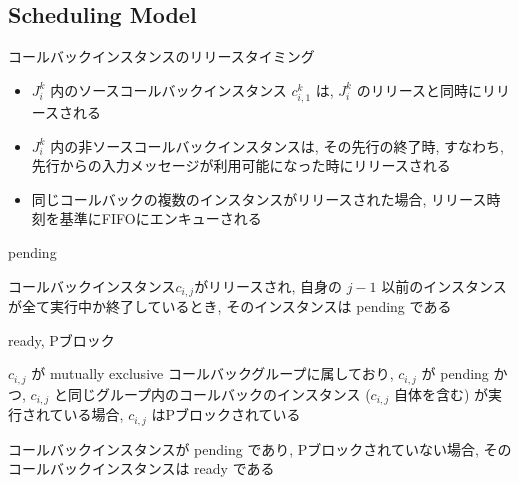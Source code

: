 \subsection{Scheduling Model}
\label{ssec: scheduling_model}


\begin{frame}{コールバックインスタンスのリリースタイミング}
    \begin{itemize}
        \item $J_{i}^{k}$ 内のソースコールバックインスタンス $c_{i, 1}^{k}$ は, $J_{i}^{k}$ のリリースと同時にリリースされる
        \item $J_{i}^{k}$ 内の非ソースコールバックインスタンスは, その先行の終了時, すなわち, 先行からの入力メッセージが利用可能になった時にリリースされる
        \item 同じコールバックの複数のインスタンスがリリースされた場合, リリース時刻を基準にFIFOにエンキューされる
    \end{itemize}
\end{frame}

\begin{frame}{pending}
    \begin{definition}[pending]
        コールバックインスタンス$c_{i, j}$がリリースされ, 自身の $j-1$ 以前のインスタンスが全て実行中か終了しているとき, そのインスタンスは pending である
    \end{definition}
\end{frame}

\begin{frame}{ready, Pブロック}
    \begin{definition}[Pブロック]
        $c_{i, j}$ が mutually exclusive コールバックグループに属しており, $c_{i, j}$ が pending かつ, $c_{i, j}$ と同じグループ内のコールバックのインスタンス ($c_{i, j}$ 自体を含む) が実行されている場合, $c_{i, j}$ はPブロックされている
    \end{definition}
    \begin{definition}[ready]
        コールバックインスタンスが pending であり, Pブロックされていない場合, そのコールバックインスタンスは ready である
    \end{definition}
\end{frame}

